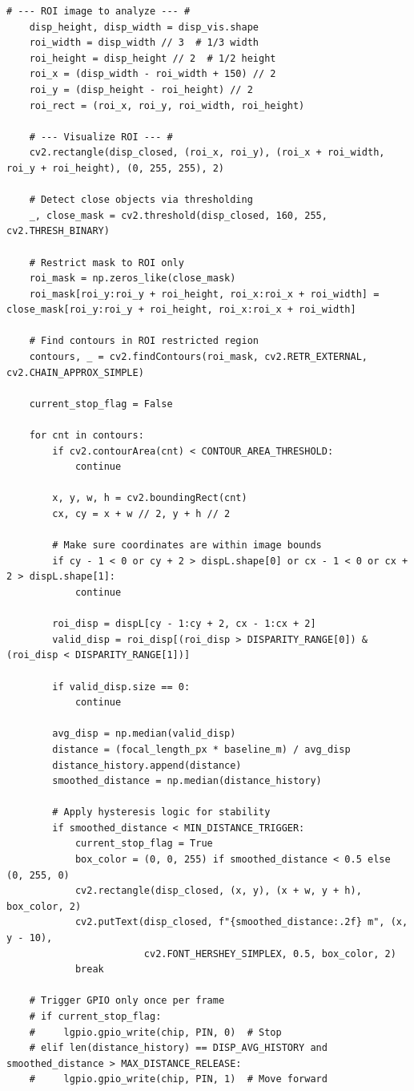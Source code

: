 \documentclass[magisterska]{pracadypl}
\begin{document}
\begin{lstlisting}[style=mypython]
    # --- ROI image to analyze --- #
    disp_height, disp_width = disp_vis.shape
    roi_width = disp_width // 3  # 1/3 width
    roi_height = disp_height // 2  # 1/2 height
    roi_x = (disp_width - roi_width + 150) // 2
    roi_y = (disp_height - roi_height) // 2
    roi_rect = (roi_x, roi_y, roi_width, roi_height)

    # --- Visualize ROI --- #
    cv2.rectangle(disp_closed, (roi_x, roi_y), (roi_x + roi_width, roi_y + roi_height), (0, 255, 255), 2)

    # Detect close objects via thresholding
    _, close_mask = cv2.threshold(disp_closed, 160, 255, cv2.THRESH_BINARY)

    # Restrict mask to ROI only
    roi_mask = np.zeros_like(close_mask)
    roi_mask[roi_y:roi_y + roi_height, roi_x:roi_x + roi_width] = close_mask[roi_y:roi_y + roi_height, roi_x:roi_x + roi_width]

    # Find contours in ROI restricted region
    contours, _ = cv2.findContours(roi_mask, cv2.RETR_EXTERNAL, cv2.CHAIN_APPROX_SIMPLE)

    current_stop_flag = False

    for cnt in contours:
        if cv2.contourArea(cnt) < CONTOUR_AREA_THRESHOLD:
            continue

        x, y, w, h = cv2.boundingRect(cnt)
        cx, cy = x + w // 2, y + h // 2

        # Make sure coordinates are within image bounds
        if cy - 1 < 0 or cy + 2 > dispL.shape[0] or cx - 1 < 0 or cx + 2 > dispL.shape[1]:
            continue

        roi_disp = dispL[cy - 1:cy + 2, cx - 1:cx + 2]
        valid_disp = roi_disp[(roi_disp > DISPARITY_RANGE[0]) & (roi_disp < DISPARITY_RANGE[1])]

        if valid_disp.size == 0:
            continue

        avg_disp = np.median(valid_disp)
        distance = (focal_length_px * baseline_m) / avg_disp
        distance_history.append(distance)
        smoothed_distance = np.median(distance_history)

        # Apply hysteresis logic for stability
        if smoothed_distance < MIN_DISTANCE_TRIGGER:
            current_stop_flag = True
            box_color = (0, 0, 255) if smoothed_distance < 0.5 else (0, 255, 0)
            cv2.rectangle(disp_closed, (x, y), (x + w, y + h), box_color, 2)
            cv2.putText(disp_closed, f"{smoothed_distance:.2f} m", (x, y - 10),
                        cv2.FONT_HERSHEY_SIMPLEX, 0.5, box_color, 2)
            break

    # Trigger GPIO only once per frame
    # if current_stop_flag:
    #     lgpio.gpio_write(chip, PIN, 0)  # Stop
    # elif len(distance_history) == DISP_AVG_HISTORY and smoothed_distance > MAX_DISTANCE_RELEASE:
    #     lgpio.gpio_write(chip, PIN, 1)  # Move forward

\end{lstlisting}
\end{document}
